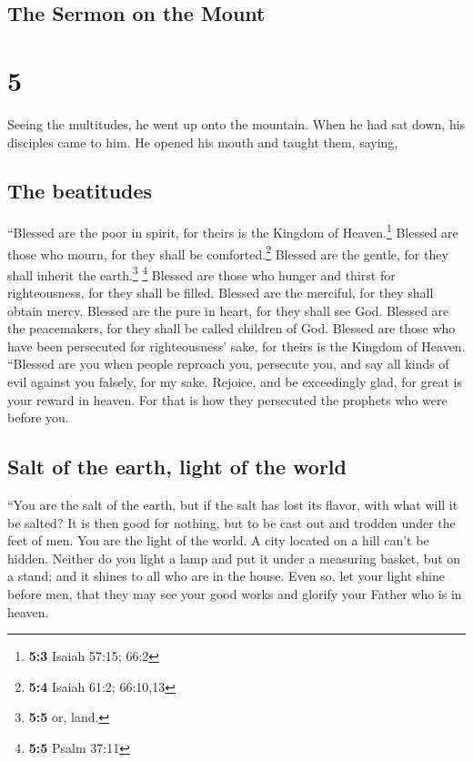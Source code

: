 \hypertarget{the-sermon-on-the-mount}{%
\subsection{The Sermon on the Mount}\label{the-sermon-on-the-mount}}

\hypertarget{section-4}{%
\section{5}\label{section-4}}

 Seeing the multitudes, he went up onto the mountain. When
he had sat down, his disciples came to him.  He opened his
mouth and taught them, saying,

\hypertarget{the-beatitudes}{%
\subsection{The beatitudes}\label{the-beatitudes}}

 ``Blessed are the poor in spirit, for theirs is the
Kingdom of Heaven.\footnote{\textbf{5:3} Isaiah 57:15; 66:2}
 Blessed are those who mourn, for they shall be
comforted.\footnote{\textbf{5:4} Isaiah 61:2; 66:10,13} 
Blessed are the gentle, for they shall inherit the earth.\footnote{\textbf{5:5}
  or, land.} \footnote{\textbf{5:5} Psalm 37:11}  Blessed
are those who hunger and thirst for righteousness, for they shall be
filled.  Blessed are the merciful, for they shall obtain
mercy.  Blessed are the pure in heart, for they shall see
God.  Blessed are the peacemakers, for they shall be
called children of God.  Blessed are those who have been
persecuted for righteousness' sake, for theirs is the Kingdom of Heaven.
 ``Blessed are you when people reproach you, persecute
you, and say all kinds of evil against you falsely, for my sake.
 Rejoice, and be exceedingly glad, for great is your
reward in heaven. For that is how they persecuted the prophets who were
before you.

\hypertarget{salt-of-the-earth-light-of-the-world}{%
\subsection{Salt of the earth, light of the
world}\label{salt-of-the-earth-light-of-the-world}}

 ``You are the salt of the earth, but if the salt has
lost its flavor, with what will it be salted? It is then good for
nothing, but to be cast out and trodden under the feet of men.
 You are the light of the world. A city located on a hill
can't be hidden.  Neither do you light a lamp and put it
under a measuring basket, but on a stand; and it shines to all who are
in the house.  Even so, let your light shine before men,
that they may see your good works and glorify your Father who is in
heaven.


